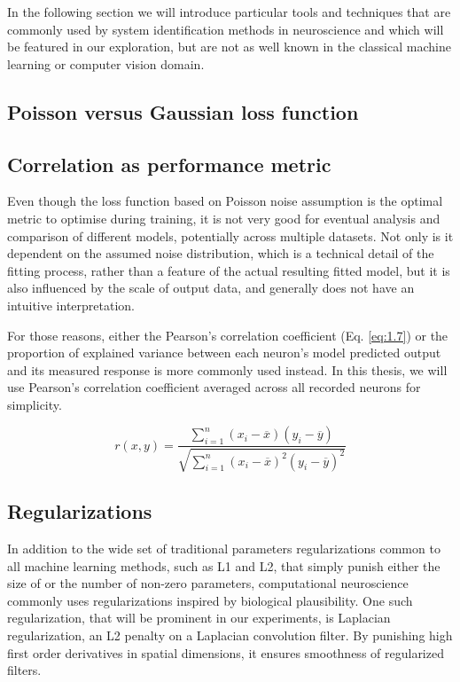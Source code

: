 In the following section we will introduce particular tools and techniques that are commonly used by system identification methods in neuroscience and which will be featured in our exploration, but are not as well known in the classical machine learning or computer vision domain. 

\subsection{Poisson versus Gaussian loss function}

\subsection{Correlation as performance metric}

Even though the loss function based on Poisson noise assumption is the optimal metric to optimise during training, it is not very good for eventual analysis and comparison of different models, potentially across multiple datasets. Not only is it dependent on the assumed noise distribution, which is a technical detail of the fitting process, rather than a feature of the actual resulting fitted model, but it is also influenced by the scale of output data, and generally does not have an intuitive interpretation.

For those reasons, either the Pearson’s correlation coefficient (Eq. \ref{eq:1.7}) or the proportion of explained variance between each neuron’s model predicted output and its measured response is more commonly used instead. In this thesis, we will use Pearson’s correlation coefficient averaged across all recorded neurons for simplicity.

\begin{equation}\label{eq:1.7}
r(x, y) = \frac{{}\sum_{i=1}^{n} (x_i - \overline{x})(y_i - \overline{y})}
{\sqrt{\sum_{i=1}^{n} (x_i - \overline{x})^2(y_i - \overline{y})^2}}
\end{equation}

\subsection{Regularizations}
In addition to the wide set of traditional parameters regularizations common to all machine learning methods, such as L1 and L2, that simply punish either the size of or the number of non-zero parameters, computational neuroscience commonly uses regularizations inspired by biological plausibility. One such regularization, that will be prominent in our experiments, is Laplacian regularization, an L2 penalty on a Laplacian convolution filter. By punishing high first order derivatives in spatial dimensions, it ensures smoothness of regularized filters.

